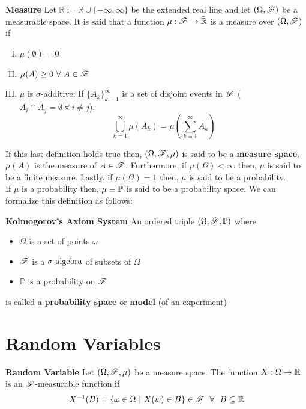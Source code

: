 \documentclass[../TGMAFFIRO.tex]{subfiles}
\begin{document}
\begin{definition}{\textbf{Measure}}
	Let $\bar{\mathbb R} := \mathbb R \cup \{-\infty, \infty\}$ be the extended real line and let $(\Omega, \mathscr{F})$ be a measurable space. It is said that a function $\mu: \mathscr{F} \rightarrow \bar{\mathbb R}$ is a measure over $(\Omega, \mathscr{F})$ if
	\begin{enumerate}[I.]
		\item $\mu(\emptyset) = 0$
		\item $\mu(A) \geq 0\ \forall \ A \in \mathscr{F} $
		\item $\mu$ is $\sigma$-additive: If $\{A_k\}_{k=1}^{\infty}$ is a set of disjoint events in $\mathscr{F}$ ($A_i \cap A_j = \emptyset \ \forall \ i \neq j$), 
		\begin{equation*}
			\bigcup_{k=1}^{\infty} \mu(A_k) = \mu(\sum_{k=1}^{\infty} A_k)
		\end{equation*}
	\end{enumerate}
\end{definition}


If this last definition holds true then, $(\Omega, \mathscr{F}, \mu)$ is said to be a \textbf{measure space}. $\mu(A)$ is the measure of $A\in\mathscr{F}$. Furthermore, if $\mu(\Omega) < \infty$ then, $\mu$ is said to be a finite measure. Lastly, if  $\mu(\Omega) = 1$ then, $\mu$ is said to be a probability.\\

If $\mu$ is a probability then, $\mu \equiv \mathbb{P}$ is said to be a probability space. We can formalize this definition as follows:

\begin{definition}{\textbf{Kolmogorov's Axiom System}}
	An ordered triple $(\Omega, \mathscr{F}, \mathbb{P})$ where
	\begin{itemize}
		\item $\Omega$ is a set of points $\omega$
		\item $\mathscr{F}$ is a $\sigma\text{-algebra}$ of subsets of $\Omega$
		\item $\mathbb P$ is a probability on $\mathscr{F}$
	\end{itemize}
	is called a \textbf{probability space} or \textbf{model} (of an experiment)
\end{definition}

\section{Random Variables}
\begin{definition}{\textbf{Random Variable}}\label{rvar}
	Let $(\Omega, \mathscr{F}, \mu)$ be a measure space. The function $X: \Omega \rightarrow \mathbb{R}$ is an $\mathscr{F}$-measurable function if
	\begin{equation}
		X^{-1}(B) = \{\omega \in \Omega \ | \ X(w) \in B\} \in \mathscr{F} \ \ \forall \ \ B \subseteq \mathbb{R}
	\end{equation}
\end{definition}
\end{document}
